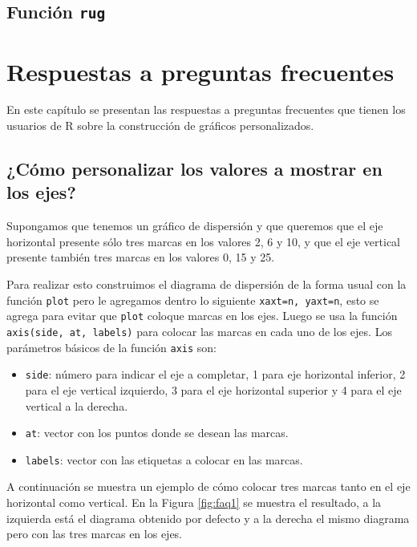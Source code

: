 \documentclass[10pt,]{krantz}
\providecommand{\tightlist}{%
  \setlength{\itemsep}{0pt}\setlength{\parskip}{0pt}}
\let\proglang=\textsf
\begin{document}
\section{\texorpdfstring{Función \texttt{rug}
}{Función rug }}\label{funcion-rug}

\chapter{Respuestas a preguntas
frecuentes}\label{respuestas-a-preguntas-frecuentes}

En este capítulo se presentan las respuestas a preguntas frecuentes que
tienen los usuarios de \proglang{R} sobre la construcción de gráficos
personalizados.

\section{¿Cómo personalizar los valores a mostrar en los
ejes?}\label{como-personalizar-los-valores-a-mostrar-en-los-ejes}

Supongamos que tenemos un gráfico de dispersión y que queremos que el
eje horizontal presente sólo tres marcas en los valores 2, 6 y 10, y que
el eje vertical presente también tres marcas en los valores 0, 15 y 25.

Para realizar esto construimos el diagrama de dispersión de la forma
usual con la función \texttt{plot} pero le agregamos dentro lo siguiente
\texttt{xaxt=\textquotesingle{}n\textquotesingle{},\ yaxt=\textquotesingle{}n\textquotesingle{}},
esto se agrega para evitar que \texttt{plot} coloque marcas en los ejes.
Luego se usa la función \texttt{axis(side,\ at,\ labels)} para colocar
las marcas en cada uno de los ejes. Los parámetros básicos de la función
\texttt{axis} son:

\begin{itemize}
\tightlist
\item
  \texttt{side}: número para indicar el eje a completar, 1 para eje
  horizontal inferior, 2 para el eje vertical izquierdo, 3 para el eje
  horizontal superior y 4 para el eje vertical a la derecha.
\item
  \texttt{at}: vector con los puntos donde se desean las marcas.
\item
  \texttt{labels}: vector con las etiquetas a colocar en las marcas.
\end{itemize}

A continuación se muestra un ejemplo de cómo colocar tres marcas tanto
en el eje horizontal como vertical. En la Figura \ref{fig:faq1} se
muestra el resultado, a la izquierda está el diagrama obtenido por
defecto y a la derecha el mismo diagrama pero con las tres marcas en los
ejes.
\end{document}

